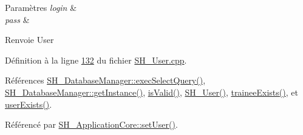 \begin{DoxyParams}{Paramètres}
{\em login} & \\
\hline
{\em pass} & \\
\hline
\end{DoxyParams}
\begin{DoxyReturn}{Renvoie}
User 
\end{DoxyReturn}


Définition à la ligne \hyperlink{SH__User_8cpp_source_l00132}{132} du fichier \hyperlink{SH__User_8cpp_source}{S\-H\-\_\-\-User.\-cpp}.



Références \hyperlink{classSH__DatabaseManager_ab8f9850cb68444ab9a4e613b36a3b044}{S\-H\-\_\-\-Database\-Manager\-::exec\-Select\-Query()}, \hyperlink{classSH__DatabaseManager_a31198eb4de0f8b18e3fa0eed09f24d19}{S\-H\-\_\-\-Database\-Manager\-::get\-Instance()}, \hyperlink{classSH__User_a07de5c02b2a02b3bb2b0aaf0886bb4d9}{is\-Valid()}, \hyperlink{classSH__User_a96c0ebb3f11c1654935aaecb92295724}{S\-H\-\_\-\-User()}, \hyperlink{classSH__User_adfc35c967cb405f4a14886676612fbb7}{trainee\-Exists()}, et \hyperlink{classSH__User_a64161b35866b1c635d5f4214095a2b1e}{user\-Exists()}.



Référencé par \hyperlink{classSH__ApplicationCore_a2dd5c029a2ea348f1dfd0a60dea476e4}{S\-H\-\_\-\-Application\-Core\-::set\-User()}.


